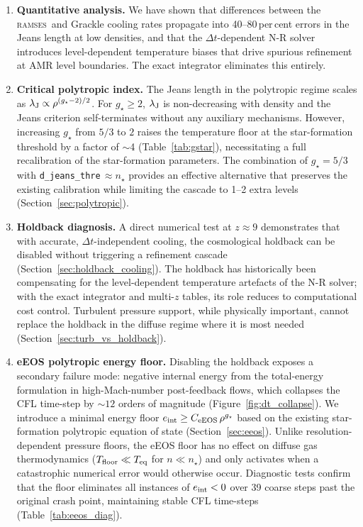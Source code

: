 \documentclass[fleqn,usenatbib]{mnras}
\newcommand{\lJ}{\lambda_{\rm J}}
\newcommand{\nstar}{n_\star}
\newcommand{\gstar}{g_\star}
\newcommand{\ramses}{\textsc{ramses}}
\newcommand{\code}[1]{\texttt{#1}}
\begin{document}
\begin{enumerate}
  \item \textbf{Quantitative analysis.}  We have shown that differences
    between the \ramses\ and Grackle cooling rates propagate into
    40--80\,per\,cent errors in the Jeans length at low densities, and
    that the $\Delta t$-dependent N-R solver introduces level-dependent
    temperature biases that drive spurious refinement at AMR level
    boundaries.  The exact integrator eliminates this entirely.

  \item \textbf{Critical polytropic index.}  The Jeans length in the
    polytropic regime scales as $\lJ \propto \rho^{(\gstar-2)/2}$.
    For $\gstar \ge 2$, $\lJ$ is non-decreasing with density and the
    Jeans criterion self-terminates without any auxiliary mechanisms.
    However, increasing $\gstar$ from $5/3$ to $2$ raises the
    temperature floor at the star-formation threshold by a factor
    of $\sim$4 (Table~\ref{tab:gstar}), necessitating a full
    recalibration of the star-formation parameters.  The combination
    of $\gstar = 5/3$ with \code{d\_jeans\_thre}$\,\approx\nstar$
    provides an effective alternative that preserves the existing
    calibration while limiting the cascade to 1--2 extra levels
    (Section~\ref{sec:polytropic}).

  \item \textbf{Holdback diagnosis.}  A direct numerical test at
    $z \approx 9$ demonstrates that with accurate,
    $\Delta t$-independent cooling, the cosmological holdback can be
    disabled without triggering a refinement cascade
    (Section~\ref{sec:holdback_cooling}).  The holdback has
    historically been compensating for the level-dependent temperature
    artefacts of the N-R solver; with the exact integrator and
    multi-$z$ tables, its role reduces to computational cost control.
    Turbulent pressure support, while physically important, cannot
    replace the holdback in the diffuse regime where it is most needed
    (Section~\ref{sec:turb_vs_holdback}).

  \item \textbf{eEOS polytropic energy floor.}  Disabling the holdback
    exposes a secondary failure mode: negative internal energy from the
    total-energy formulation in high-Mach-number post-feedback flows,
    which collapses the CFL time-step by $\sim 12$ orders of magnitude
    (Figure~\ref{fig:dt_collapse}).  We introduce a minimal energy
    floor $e_{\rm int} \ge C_{\rm eEOS}\,\rho^{\gstar}$ based on the
    existing star-formation polytropic equation of state
    (Section~\ref{sec:eeos}).  Unlike resolution-dependent pressure
    floors, the eEOS floor has no effect on diffuse gas thermodynamics
    ($T_{\rm floor} \ll T_{\rm eq}$ for $n \ll \nstar$) and only
    activates when a catastrophic numerical error would otherwise
    occur.  Diagnostic tests confirm that the floor eliminates all
    instances of $e_{\rm int} < 0$ over 39 coarse steps past the
    original crash point, maintaining stable CFL time-steps
    (Table~\ref{tab:eeos_diag}).
\end{enumerate}
\end{document}
